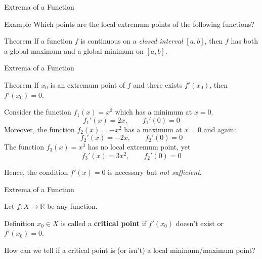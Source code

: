 \documentclass{beamer}
\begin{document}
\begin{frame}{Extrema of a Function}

\begin{exampleblock}{Example}
    Which points are the local extremum points of the following functions? \\ \bigskip
 \pause
 \pause
 
\end{exampleblock}
\pause
\begin{block}{Theorem}
If a function \(f\) is continuous on a \textit{closed interval} \([a, b]\), then \(f\) has both a global maximum and a global minimum on \([a, b]\).
    
\end{block}

  
\end{frame}

\begin{frame}{Extrema of a Function}


\begin{block}{Theorem}
If \(x_0\) is an extremum point of \(f\) and there exists \(f'(x_0)\), then \(f'(x_0) = 0\).

\end{block}
\pause

\begin{example}
    Consider the function $f_1(x)=x^2$ which has a minimum at $x=0$.
    \[ f_1'(x)=2x ,\qquad f_1'(0)=0 \]
    \pause Moreover, the function $f_2(x)=-x^2$ has a maximum at $x=0$ and again:
    \[ f_2'(x)=-2x ,\qquad f_2'(0)=0 \]
\pause The function $f_3(x)=x^3$ has no local extremum point, yet    
    \[ f_3'(x)=3x^2 ,\qquad f_2'(0)=0 \]
\end{example}
  \pause Hence, the condition $f'(x)=0$ is necessary but \textit{not sufficient}.
\end{frame}


\begin{frame}{Extrema of a Function}

Let \(f : X \to \mathbb{R}\) be any function.

\begin{block}{Definition}
$x_0 \in X$ is called a \textbf{critical point} if $f'(x_0)$ doesn't exist or $f'(x_0)=0$.

\end{block}
\pause
How can we tell if a critical point is (or isn't) a local minimum/maximum point?
\end{frame}
\end{document}
